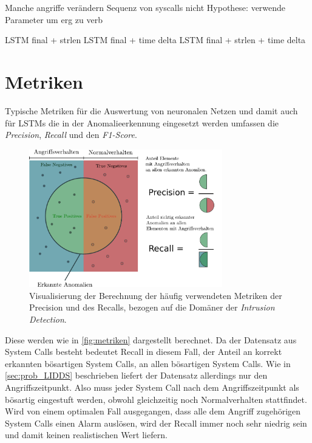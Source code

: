                 Manche angriffe verändern Sequenz von syscalls nicht
                Hypothese:
                verwende Parameter um erg zu verb

                LSTM final + strlen
                LSTM final + time delta
                LSTM final + strlen + time delta

                \fi

\section{Metriken}\label{sec:Metriken}

    Typische Metriken für die Auswertung von neuronalen Netzen und damit auch für \acp{LSTM} die in der Anomalieerkennung eingesetzt werden umfassen die \textit{Precision}, \textit{Recall} und den \textit{F1-Score}.
    \begin{figure}
        \centering
        \includegraphics[width=0.75\textwidth]{images/Illustrationen/Precision.pdf}
        \caption{Visualisierung der Berechnung der häufig verwendeten Metriken der Precision und des Recalls, bezogen auf die Domäner der \textit{Intrusion Detection}.}\label{fig:metriken}
    \end{figure}
    Diese werden wie in \autoref{fig:metriken} dargestellt berechnet.
    Da der Datensatz aus System Calls besteht bedeutet Recall in diesem Fall, der Anteil an korrekt erkannten bösartigen System Calls, an allen bösartigen System Calls.
    Wie in \autoref{sec:prob_LIDDS} beschrieben liefert der Datensatz allerdings nur den Angriffszeitpunkt.
    Also muss jeder System Call nach dem Angriffszeitpunkt als bösartig eingestuft werden, obwohl gleichzeitig noch Normalverhalten stattfindet.
    Wird von einem optimalen Fall ausgegangen, dass alle dem Angriff zugehörigen System Calls einen Alarm auslösen, wird der Recall immer noch sehr niedrig sein und damit keinen realistischen Wert liefern.
